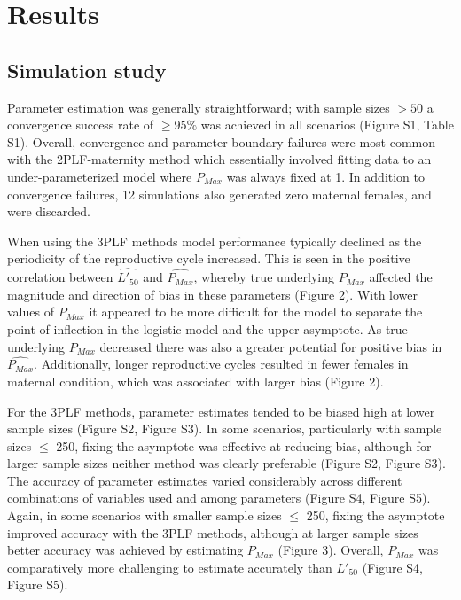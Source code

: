\documentclass[
]{article}
\begin{document}
\section{Results}\label{results}

\subsection{Simulation study}\label{simulation-study}

Parameter estimation was generally straightforward; with sample sizes \(> 50\) a convergence success rate of \(\geq 95\%\) was achieved in all scenarios (Figure S1, Table S1). Overall, convergence and parameter boundary failures were most common with the 2PLF-maternity method which essentially involved fitting data to an under-parameterized model where \(P_{Max}\) was always fixed at 1. In addition to convergence failures, 12 simulations also generated zero maternal females, and were discarded.

When using the 3PLF methods model performance typically declined as the periodicity of the reproductive cycle increased. This is seen in the positive correlation between \(\widehat{L'_{50}}\) and \(\widehat{P_{Max}}\), whereby true underlying \(P_{Max}\) affected the magnitude and direction of bias in these parameters (Figure 2). With lower values of \(P_{Max}\) it appeared to be more difficult for the model to separate the point of inflection in the logistic model and the upper asymptote. As true underlying \(P_{Max}\) decreased there was also a greater potential for positive bias in \(\widehat{P_{Max}}\). Additionally, longer reproductive cycles resulted in fewer females in maternal condition, which was associated with larger bias (Figure 2).

For the 3PLF methods, parameter estimates tended to be biased high at lower sample sizes (Figure S2, Figure S3). In some scenarios, particularly with sample sizes \(\leq\) 250, fixing the asymptote was effective at reducing bias, although for larger sample sizes neither method was clearly preferable (Figure S2, Figure S3). The accuracy of parameter estimates varied considerably across different combinations of variables used and among parameters (Figure S4, Figure S5). Again, in some scenarios with smaller sample sizes \(\leq\) 250, fixing the asymptote improved accuracy with the 3PLF methods, although at larger sample sizes better accuracy was achieved by estimating \(P_{Max}\) (Figure 3). Overall, \(P_{Max}\) was comparatively more challenging to estimate accurately than \(L'_{50}\) (Figure S4, Figure S5).
\end{document}

